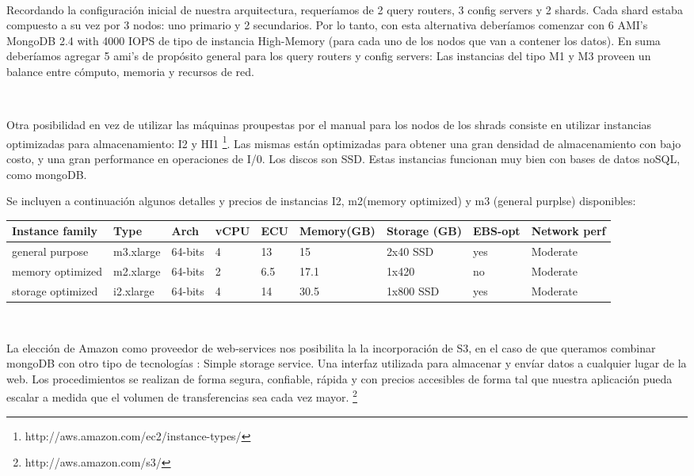 ~

Recordando la configuración inicial de nuestra arquitectura, requeríamos de 2 query routers, 3 config servers y 2 shards.
Cada shard estaba compuesto a su vez por 3 nodos: uno primario y 2 secundarios. 
Por lo tanto, con esta alternativa deberíamos comenzar con 6 AMI's MongoDB 2.4 with 4000 IOPS de tipo de instancia
High-Memory (para cada uno de los nodos que van a contener los datos). En suma deberíamos agregar 5 ami's de propósito
general para los query routers y config servers: Las instancias del tipo M1 y M3 proveen un balance entre cómputo, 
memoria y recursos de red.

~

Otra posibilidad en vez de utilizar las máquinas proupestas por el manual para los nodos de los shrads
consiste en utilizar instancias
optimizadas para almacenamiento: I2 y HI1 \footnote{http://aws.amazon.com/ec2/instance-types/}. Las mismas están optimizadas
para obtener una gran densidad de almacenamiento con bajo costo, y una gran performance en operaciones de I/0.
Los discos son SSD.
Estas instancias funcionan muy bien con bases de datos noSQL, como mongoDB.

Se incluyen a continuación algunos detalles y precios de instancias I2, m2(memory optimized)
y m3 (general purplse) disponibles:

\begin{center}
    \small{
    \begin{tabular}{| l | l | l | l | l | l | l | l | l |}
    \hline
    Instance family & Type & Arch & vCPU & ECU & Memory(GB) & Storage (GB) & EBS-opt & Network perf\\ \hline
    general purpose & m3.xlarge & 64-bits & 4 & 13 & 15 & 2x40 SSD & yes & Moderate \\ \hline
    memory optimized & m2.xlarge & 64-bits & 2 & 6.5 & 17.1 & 1x420 & no & Moderate \\ \hline 
    storage optimized & i2.xlarge & 64-bits & 4 & 14 & 30.5 & 1x800 SSD & yes & Moderate  \\ \hline
    \end{tabular}
    }
\end{center}

~

La elección de Amazon como proveedor de web-services nos posibilita la 
la incorporación de S3, en el caso de que queramos combinar mongoDB con otro tipo de tecnologías
: Simple storage service. Una interfaz
utilizada para almacenar y envíar datos a cualquier lugar de la web. Los procedimientos se realizan de forma segura,
confiable, rápida y con precios accesibles de forma tal que nuestra aplicación pueda escalar a medida que el volumen
de transferencias sea cada vez mayor. \footnote{http://aws.amazon.com/s3/}

